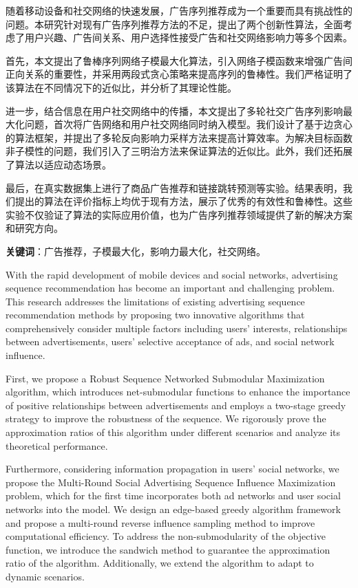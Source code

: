 \cleardoublepage
{}

随着移动设备和社交网络的快速发展，广告序列推荐成为一个重要而具有挑战性的问题。本研究针对现有广告序列推荐方法的不足，提出了两个创新性算法，全面考虑了用户兴趣、广告间关系、用户选择性接受广告和社交网络影响力等多个因素。

首先，本文提出了鲁棒序列网络子模最大化算法，引入网络子模函数来增强广告间正向关系的重要性，并采用两段式贪心策略来提高序列的鲁棒性。我们严格证明了该算法在不同情况下的近似比，并分析了其理论性能。

进一步，结合信息在用户社交网络中的传播，本文提出了多轮社交广告序列影响最大化问题，首次将广告网络和用户社交网络同时纳入模型。我们设计了基于边贪心的算法框架，并提出了多轮反向影响力采样方法来提高计算效率。为解决目标函数非子模性的问题，我们引入了三明治方法来保证算法的近似比。此外，我们还拓展了算法以适应动态场景。

最后，在真实数据集上进行了商品广告推荐和链接跳转预测等实验。结果表明，我们提出的算法在评价指标上均优于现有方法，展示了优秀的有效性和鲁棒性。这些实验不仅验证了算法的实际应用价值，也为广告序列推荐领域提供了新的解决方案和研究方向。


\textbf{关键词}：广告推荐，子模最大化，影响力最大化，社交网络。


\cleardoublepage
{}

With the rapid development of mobile devices and social networks, advertising sequence recommendation has become an important and challenging problem. This research addresses the limitations of existing advertising sequence recommendation methods by proposing two innovative algorithms that comprehensively consider multiple factors including users' interests, relationships between advertisements, users' selective acceptance of ads, and social network influence.

First, we propose a Robust Sequence Networked Submodular Maximization algorithm, which introduces net-submodular functions to enhance the importance of positive relationships between advertisements and employs a two-stage greedy strategy to improve the robustness of the sequence. We rigorously prove the approximation ratios of this algorithm under different scenarios and analyze its theoretical performance.

Furthermore, considering information propagation in users' social networks, we propose the Multi-Round Social Advertising Sequence Influence Maximization problem, which for the first time incorporates both ad networks and user social networks into the model. We design an edge-based greedy algorithm framework and propose a multi-round reverse influence sampling method to improve computational efficiency. To address the non-submodularity of the objective function, we introduce the sandwich method to guarantee the approximation ratio of the algorithm. Additionally, we extend the algorithm to adapt to dynamic scenarios.

